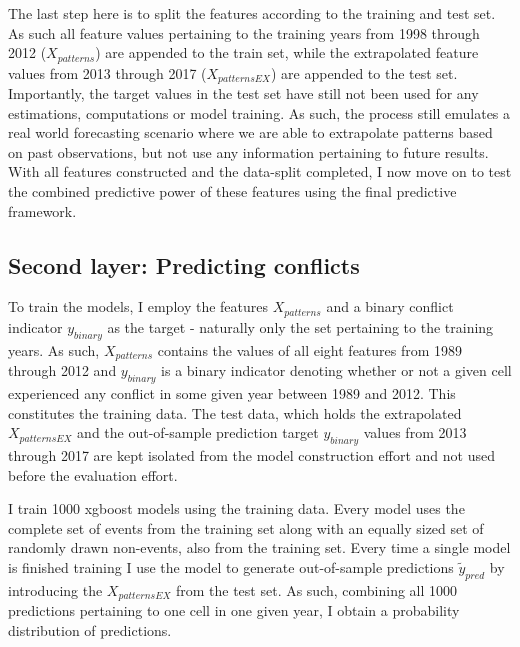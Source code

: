 \documentclass[a4paper]{article}
\begin{document}
The last step here is to split the features according to the training and test set. As such all feature values pertaining to the training years from 1998 through 2012 ($X_{patterns}$) are appended to the train set, while the extrapolated feature values from 2013 through 2017 ($X_{patternsEX}$) are appended to the test set. Importantly, the target values in the test set have still not been used for any estimations, computations or model training. As such, the process still emulates a real world forecasting scenario where we are able to extrapolate patterns based on past observations, but not use any information pertaining to future results. With all features constructed and the data-split completed, I now move on to test the combined predictive power of these features using the final predictive framework.\par

\subsection{Second layer: Predicting conflicts}


To train the models, I employ the features $X_{patterns}$ and a binary conflict indicator $y_{binary}$ as the target - naturally only the set pertaining to the training years. As such, $X_{patterns}$ contains the values of all eight features from 1989 through 2012 and $y_{binary}$ is a binary indicator denoting whether or not a given cell experienced any conflict in some given year between 1989 and 2012. This constitutes the training data. The test data, which holds the extrapolated $X_{patternsEX}$ and the out-of-sample prediction target $y_{binary}$ values from 2013 through 2017 are kept isolated from the model construction effort and not used before the evaluation effort.\par

I train 1000 xgboost models using the training data. Every model uses the complete set of events from the training set along with an equally sized set of randomly drawn non-events, also from the training set. Every time a single model is finished training I use the model to generate out-of-sample predictions $\tilde{y}_{pred}$ by introducing the $X_{patternsEX}$ from the test set. As such, combining all 1000 predictions pertaining to one cell in one given year, I obtain a probability distribution of predictions. \par
\end{document}
